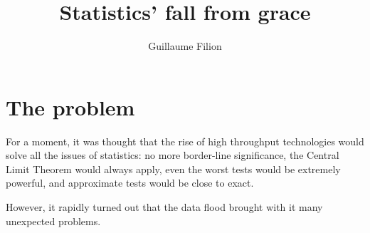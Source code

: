 \documentclass[a4paper]{article}
\title{Statistics' fall from grace}
\author{Guillaume Filion}
\theoremstyle{definition}
\begin{document}
\maketitle


\section{The problem}

For a moment, it was thought that the rise of high throughput
technologies would solve all the issues of statistics: no more
border-line significance, the Central Limit Theorem would always
apply, even the worst tests would be extremely powerful, and
approximate tests would be close to exact.

However, it rapidly turned out that the data flood brought with
it many unexpected problems.
\end{document}
